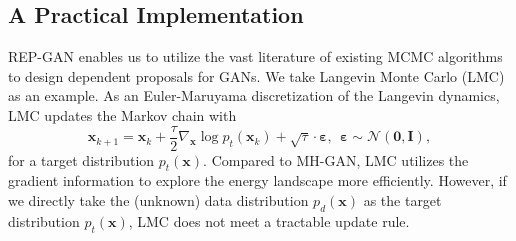 \documentclass{article} %
\newcommand{\bx}{\mathbf{x}}
\newcommand{\bI}{\mathbf{I}}
\newcommand{\bvarepsilon}{\bm{\varepsilon}}
\newcommand{\cN}{\mathcal{N}}
\newcommand{\cX}{\mathcal{X}}
\newcommand{\cZ}{\mathcal{Z}}
\newcommand{\bzero}{\mathbf{0}}
\newcommand{\<}{\left\langle}
\renewcommand{\>}{\right\rangle}
\begin{document}



\subsection{A Practical Implementation}
\label{sec:proposal}
REP-GAN enables us to utilize the vast literature of existing MCMC algorithms \citep{neal2010MCMC} to design dependent proposals for GANs. We take Langevin Monte Carlo (LMC) as an example.
As an Euler-Maruyama discretization of the Langevin dynamics, LMC updates the Markov chain with
\begin{equation}
    \bx_{k+1}=\bx_k+\frac{\tau}{2}\nabla_{\bx}\log p_t(\bx_k)+\sqrt{\tau}\cdot\bvarepsilon,~~\bvarepsilon\sim\cN(\bzero,\bI),
\end{equation}
for a target distribution $p_t(\bx)$. Compared to MH-GAN, LMC utilizes the gradient information to explore the energy landscape more efficiently. However, if we directly take the (unknown) data distribution $p_d(\bx)$ as the target distribution $p_t(\bx)$, LMC does not meet a tractable update rule. 
\end{document}
